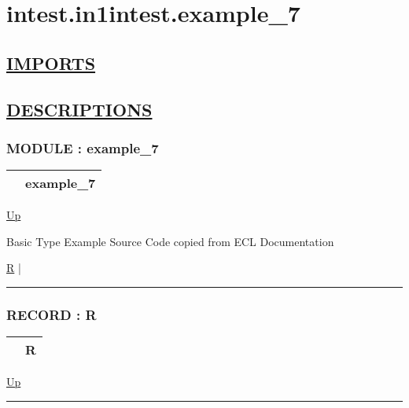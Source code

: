 \chapter*{intest.in1intest.example\_7}
\hypertarget{ecldoc:toc:intest.in1intest.example_7}{}

\section*{\underline{IMPORTS}}

\section*{\underline{DESCRIPTIONS}}
\subsection*{MODULE : example\_7}
\hypertarget{ecldoc:intest.in1intest.example_7}{}

{\renewcommand{\arraystretch}{1.5}
\begin{tabularx}{\textwidth}{|>{\raggedright\arraybackslash}l|X|}
\hline
\hspace{0pt} & example\_7 \\
\hline
\end{tabularx}
}

\hyperlink{ecldoc:toc:intest/in1intest}{Up}

\par
Basic Type Example Source Code copied from ECL Documentation


\hyperlink{ecldoc:intest.in1intest.example_7.r}{R}  |

\rule{\textwidth}{0.4pt}

\subsection*{RECORD : R}
\hypertarget{ecldoc:intest.in1intest.example_7.r}{}

{\renewcommand{\arraystretch}{1.5}
\begin{tabularx}{\textwidth}{|>{\raggedright\arraybackslash}l|X|}
\hline
\hspace{0pt} & R \\
\hline
\end{tabularx}
}

\hyperlink{ecldoc:intest.in1intest.example_7}{Up}

\par


\rule{\textwidth}{0.4pt}


